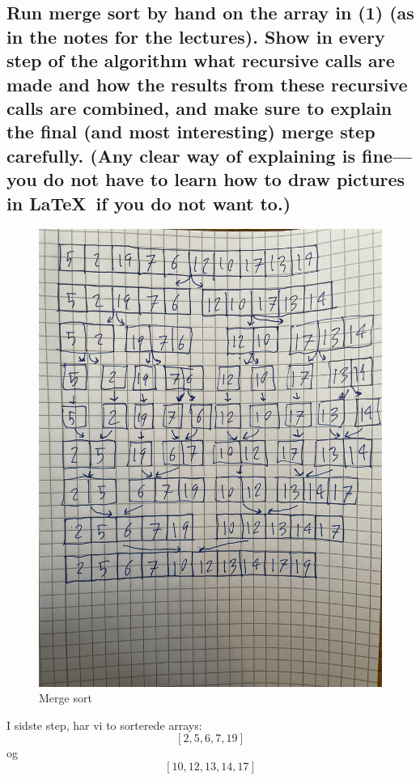 \documentclass[a4paper,12pt]{article}
\begin{document}
\subsection[]{Run merge sort by hand on the array in (1) (as in the notes for the lectures). Show in every step of the algorithm what recursive calls are made and how the results from these recursive calls are combined, and make sure to explain the final (and most interesting) merge step carefully. (Any clear way of explaining is fine—you do not have to learn how to draw pictures in \LaTeX\ if you do not want to.)} 

\begin{figure}[H]
    \centering  
    \includegraphics[width=1\textwidth, angle=-90]{IMG_2075.jpg}
    \caption{Merge sort}
\end{figure}
\par
I sidste step, har vi to sorterede arrays:\\
\[[2, 5, 6, 7, 19]\] og \[[10, 12, 13, 14, 17]\] \\
\end{document}
